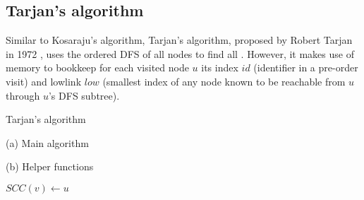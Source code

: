 \subsection{Tarjan's algorithm} \label{algorithm-scc-tarjan}
Similar to Kosaraju's algorithm, Tarjan's algorithm, proposed by Robert Tarjan in 1972 \cite{tarjan72}, uses the ordered DFS of all nodes to find all . However, it makes use of memory to bookkeep for each visited node $u$ its index $id$ (identifier in a pre-order visit) and lowlink $low$ (smallest index of any node known to be reachable from $u$ through $u$'s DFS subtree).
\begin{algorithm}[h]
    \caption{Tarjan's algorithm}
    \label{alg-tarjan}
    \begin{minipage}[t]{0.40\linewidth}
        (a) Main algorithm
        \begin{algorithmic}[1]
                \EndFor
                    \EndIf
                \EndFor
                \State {}
            \EndFunction
        \end{algorithmic}
    \end{minipage}
    \begin{minipage}[t]{0.58\textwidth}
        (b) Helper functions
        \begin{algorithmic}[1]

                 \label{alg-line:tarjan-dfs-assign-low-init}
                    \label{alg-line:tarjan-dfs-cycle-begin}
                    \EndIf
                \EndFor
                \label{alg-line:tarjan-dfs-cycle-end}
                        {$SCC(v) \gets u$}
                    \EndWhile
                \EndIf
            \EndFunction
        \end{algorithmic}
    \end{minipage}
\end{algorithm}
